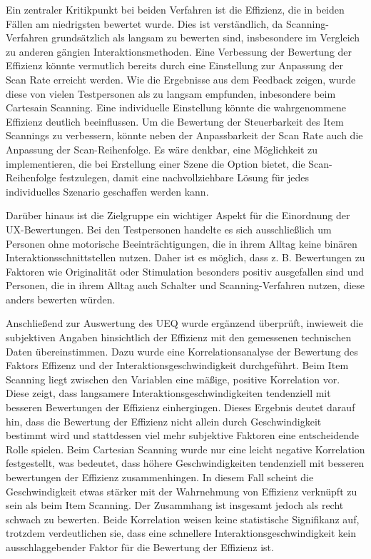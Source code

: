 Ein zentraler Kritikpunkt bei beiden Verfahren ist die Effizienz, die in beiden Fällen am niedrigsten bewertet wurde. Dies ist verständlich, da Scanning-Verfahren grundsätzlich als langsam zu bewerten sind, insbesondere im Vergleich zu anderen gängien Interaktionsmethoden. Eine Verbessung der Bewertung der Effizienz könnte vermutlich bereits durch eine Einstellung zur Anpassung der Scan Rate erreicht werden. Wie die Ergebnisse aus dem Feedback zeigen, wurde diese von vielen Testpersonen als zu langsam empfunden, inbesondere beim Cartesain Scanning. Eine individuelle Einstellung könnte die wahrgenommene Effizienz deutlich beeinflussen. 
Um die Bewertung der Steuerbarkeit des Item Scannings zu verbessern, könnte neben der Anpassbarkeit der Scan Rate auch die Anpassung der Scan-Reihenfolge. Es wäre denkbar, eine Möglichkeit zu implementieren, die bei Erstellung einer Szene die Option bietet, die Scan-Reihenfolge festzulegen, damit eine nachvollziehbare Lösung für jedes individuelles Szenario geschaffen werden kann. 

Darüber hinaus ist die Zielgruppe ein wichtiger Aspekt für die Einordnung der UX-Bewertungen. Bei den Testpersonen handelte es sich ausschließlich um Personen ohne motorische Beeinträchtigungen, die in ihrem Alltag keine binären Interaktionsschnittstellen nutzen. Daher ist es möglich, dass z. B.  Bewertungen zu Faktoren wie Originalität oder Stimulation besonders positiv ausgefallen sind und Personen, die in ihrem Alltag auch Schalter und Scanning-Verfahren nutzen, diese anders bewerten würden. 

Anschließend zur Auswertung des UEQ wurde ergänzend überprüft, inwieweit  die subjektiven Angaben hinsichtlich der Effizienz mit den gemessenen technischen Daten übereinstimmen. Dazu wurde eine Korrelationsanalyse der Bewertung des Faktors Effizenz und der Interaktionsgeschwindigkeit durchgeführt. 
Beim Item Scanning liegt zwischen den Variablen eine mäßige, positive Korrelation vor. Diese zeigt, dass langsamere Interaktionsgeschwindigkeiten tendenziell mit besseren Bewertungen der Effizienz einhergingen. Dieses Ergebnis deutet darauf hin, dass die Bewertung der Effizienz nicht allein durch Geschwindigkeit bestimmt wird und stattdessen viel mehr subjektive Faktoren eine entscheidende Rolle spielen.
Beim Cartesian Scanning wurde nur eine leicht negative Korrelation festgestellt, was bedeutet, dass höhere Geschwindigkeiten tendenziell mit besseren bewertungen der Effizienz zusammenhingen. In diesem Fall scheint die Geschwindigkeit etwas stärker mit der Wahrnehmung von Effizienz verknüpft zu sein als beim Item Scanning. Der Zusammhang ist insgesamt jedoch als recht schwach zu bewerten. Beide Korrelation weisen keine statistische Signifikanz auf, trotzdem verdeutlichen sie, dass eine schnellere Interaktionsgeschwindigkeit kein ausschlaggebender Faktor für die Bewertung der Effizienz ist.

